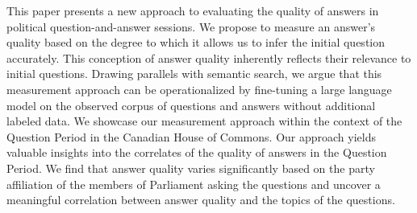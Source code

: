 This paper presents a new approach to evaluating the quality of answers in political question-and-answer sessions. We propose to measure an answer’s quality based on the degree to which it allows us to infer the initial question accurately. This conception of answer quality inherently reflects their relevance to initial questions. Drawing parallels with semantic search, we argue that this measurement approach can be operationalized by fine-tuning a large language model on the observed corpus of questions and answers without additional labeled data. We showcase our measurement approach within the context of the Question Period in the Canadian House of Commons. Our approach yields valuable insights into the correlates of the quality of answers in the Question Period. We find that answer quality varies significantly based on the party affiliation of the members of Parliament asking the questions and uncover a meaningful correlation between answer quality and the topics of the questions.